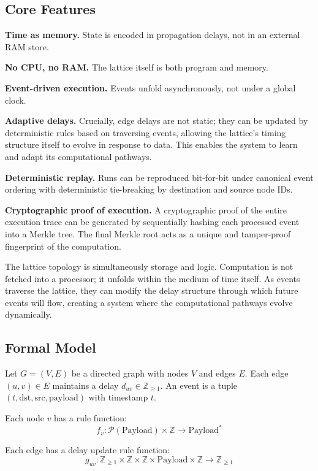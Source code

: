 \documentclass[conference]{IEEEtran}
\begin{document}
\subsection{Core Features}

\textbf{Time as memory.} State is encoded in propagation delays, not in an external RAM store.

\textbf{No CPU, no RAM.} The lattice itself is both program and memory.

\textbf{Event-driven execution.} Events unfold asynchronously, not under a global clock.

\textbf{Adaptive delays.} Crucially, edge delays are not static; they can be updated by deterministic rules based on traversing events, allowing the lattice's timing structure itself to evolve in response to data. This enables the system to learn and adapt its computational pathways.

\textbf{Deterministic replay.} Runs can be reproduced bit-for-bit under canonical event ordering with deterministic tie-breaking by destination and source node IDs.

\textbf{Cryptographic proof of execution.} A cryptographic proof of the entire execution trace can be generated by sequentially hashing each processed event into a Merkle tree. The final Merkle root acts as a unique and tamper-proof fingerprint of the computation.

The lattice topology is simultaneously storage and logic. Computation is not fetched into a processor; it unfolds within the medium of time itself. As events traverse the lattice, they can modify the delay structure through which future events will flow, creating a system where the computational pathways evolve dynamically.

\subsection{Formal Model}

Let $G = (V, E)$ be a directed graph with nodes $V$ and edges $E$. Each edge $(u,v) \in E$ maintains a delay $d_{uv} \in \mathbb{Z}_{\geq 1}$. An event is a tuple $(t, \text{dst}, \text{src}, \text{payload})$ with timestamp $t$.

Each node $v$ has a rule function:
$$f_v: \mathcal{P}(\text{Payload}) \times \mathbb{Z} \to \text{Payload}^*$$

Each edge has a delay update rule function:
$$g_{uv}: \mathbb{Z}_{\geq 1} \times \mathbb{Z} \times \mathbb{Z} \times \text{Payload} \times \mathbb{Z} \to \mathbb{Z}_{\geq 1}$$
\end{document}
